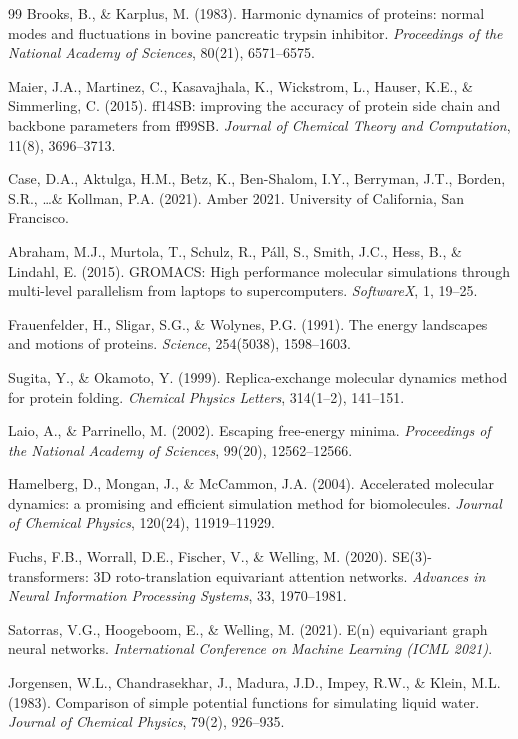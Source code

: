 \documentclass[11pt,a4paper]{article}
\begin{document}
\begin{thebibliography}{99}
Brooks, B., \& Karplus, M. (1983).
Harmonic dynamics of proteins: normal modes and fluctuations in bovine pancreatic trypsin inhibitor.
\textit{Proceedings of the National Academy of Sciences}, 80(21), 6571--6575.

Maier, J.A., Martinez, C., Kasavajhala, K., Wickstrom, L., Hauser, K.E., \& Simmerling, C. (2015).
ff14SB: improving the accuracy of protein side chain and backbone parameters from ff99SB.
\textit{Journal of Chemical Theory and Computation}, 11(8), 3696--3713.

Case, D.A., Aktulga, H.M., Betz, K., Ben-Shalom, I.Y., Berryman, J.T., Borden, S.R., \ldots \& Kollman, P.A. (2021).
Amber 2021. University of California, San Francisco.

Abraham, M.J., Murtola, T., Schulz, R., P\'{a}ll, S., Smith, J.C., Hess, B., \& Lindahl, E. (2015).
GROMACS: High performance molecular simulations through multi-level parallelism from laptops to supercomputers.
\textit{SoftwareX}, 1, 19--25.

Frauenfelder, H., Sligar, S.G., \& Wolynes, P.G. (1991).
The energy landscapes and motions of proteins.
\textit{Science}, 254(5038), 1598--1603.

Sugita, Y., \& Okamoto, Y. (1999).
Replica-exchange molecular dynamics method for protein folding.
\textit{Chemical Physics Letters}, 314(1--2), 141--151.

Laio, A., \& Parrinello, M. (2002).
Escaping free-energy minima.
\textit{Proceedings of the National Academy of Sciences}, 99(20), 12562--12566.

Hamelberg, D., Mongan, J., \& McCammon, J.A. (2004).
Accelerated molecular dynamics: a promising and efficient simulation method for biomolecules.
\textit{Journal of Chemical Physics}, 120(24), 11919--11929.

Fuchs, F.B., Worrall, D.E., Fischer, V., \& Welling, M. (2020).
SE(3)-transformers: 3D roto-translation equivariant attention networks.
\textit{Advances in Neural Information Processing Systems}, 33, 1970--1981.

Satorras, V.G., Hoogeboom, E., \& Welling, M. (2021).
E(n) equivariant graph neural networks.
\textit{International Conference on Machine Learning (ICML 2021)}.

Jorgensen, W.L., Chandrasekhar, J., Madura, J.D., Impey, R.W., \& Klein, M.L. (1983).
Comparison of simple potential functions for simulating liquid water.
\textit{Journal of Chemical Physics}, 79(2), 926--935.


\end{thebibliography}
\end{document}
